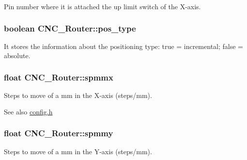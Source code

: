 Pin number where it is attached the up limit switch of the X-\/axis. 

\hypertarget{class_c_n_c___router_afd35356064c7667cbdf21c44a7dd7cf5}{
\subsubsection[{pos\+\_\+type}]{\setlength{\rightskip}{0pt plus 5cm}boolean C\+N\+C\+\_\+\+Router\+::pos\+\_\+type\hspace{0.3cm}{\ttfamily [private]}}}\label{class_c_n_c___router_afd35356064c7667cbdf21c44a7dd7cf5}


It stores the information about the positioning type\+: true = incremental; false = absolute. 

\hypertarget{class_c_n_c___router_ad8830a7b387905027b8a1a9e3b31e3c7}{
\subsubsection[{spmmx}]{\setlength{\rightskip}{0pt plus 5cm}float C\+N\+C\+\_\+\+Router\+::spmmx\hspace{0.3cm}{\ttfamily [private]}}}\label{class_c_n_c___router_ad8830a7b387905027b8a1a9e3b31e3c7}


Steps to move of a mm in the X-\/axis (steps/mm). 

\begin{DoxySeeAlso}{See also}
\hyperlink{config_8h}{config.\+h} 
\end{DoxySeeAlso}
\hypertarget{class_c_n_c___router_ab44dd3a48e5c03f3484cd223cb8f9444}{
\subsubsection[{spmmy}]{\setlength{\rightskip}{0pt plus 5cm}float C\+N\+C\+\_\+\+Router\+::spmmy\hspace{0.3cm}{\ttfamily [private]}}}\label{class_c_n_c___router_ab44dd3a48e5c03f3484cd223cb8f9444}


Steps to move of a mm in the Y-\/axis (steps/mm). 

